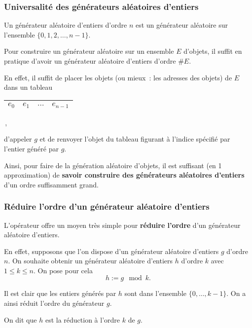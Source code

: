 \begin{frame}[fragile]
\frametitle{Universalité des générateurs aléatoires d'entiers}
Un \alert{générateur aléatoire d'entiers d'ordre $n$} est un générateur
aléatoire sur l'ensemble $\{0, 1, 2, \dots, n - 1\}$.
\bigskip
\bigskip

Pour construire un générateur aléatoire sur un ensemble $E$ d'objets,
il suffit en pratique d'avoir un générateur aléatoire d'entiers d'ordre
$\# E$.
\medskip

En effet, il suffit de placer les objets (ou mieux~: les adresses des
objets) de $E$ dans un tableau
\begin{center}
    \begin{tabular}{|c|c|c|c|} \hline
        $e_0$ & $e_1$ & $\dots$ & $e_{n - 1}$ \\ \hline
    \end{tabular}\,,
\end{center}
d'appeler $g$ et de renvoyer l'objet du tableau figurant à l'indice
spécifié par l'entier généré par $g$.
\bigskip
\bigskip

Ainsi, pour faire de la génération aléatoire d'objets, il est suffisant
(en 1\iere{} approximation) de
{\bf savoir construire des générateurs aléatoires d'entiers} d'un ordre
suffisamment grand.
\end{frame}

\begin{frame}[fragile]
\frametitle{Réduire l'ordre d'un générateur aléatoire d'entiers}
L'opérateur  \fg{} offre un moyen très simple pour
{\bf réduire l'ordre} d'un générateur aléatoire d'entiers.
\medskip

En effet, supposons que l'on dispose d'un générateur aléatoire d'entiers
$g$ d'ordre $n$. On souhaite obtenir un générateur aléatoire d'entiers
$h$ d'ordre $k$ avec $1 \leq k \leq n$. On pose pour cela
\begin{equation*} h := g \mod k. \end{equation*}
\medskip

Il est clair que les entiers générés par $h$ sont dans l'ensemble
$\{0, \dots, k - 1\}$. On a ainsi réduit l'ordre du générateur $g$.
\bigskip
\bigskip

On dit que $h$ est la \alert{réduction} à l'ordre $k$ de $g$.
\end{frame}

